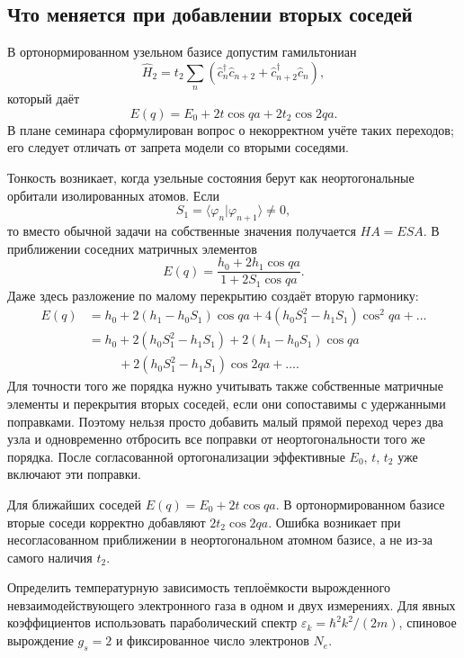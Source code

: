 \documentclass[../final.tex]{subfiles}
\begin{document}
\subsection*{Что меняется при добавлении вторых соседей}

В ортонормированном узельном базисе допустим гамильтониан
\[
    \hat H_2=t_2\sum_n
       (\hat c_n^\dagger\hat c_{n+2}+\hat c_{n+2}^\dagger\hat c_n),
\]
который даёт
\[
    E(q)=E_0+2t\cos qa+2t_2\cos2qa.
\]
В плане семинара сформулирован вопрос о некорректном учёте таких
переходов; его следует отличать от запрета модели со вторыми соседями.

Тонкость возникает, когда узельные состояния берут как
неортогональные орбитали изолированных атомов. Если
\[
    S_1=\langle\varphi_n|\varphi_{n+1}\rangle\ne0,
\]
то вместо обычной задачи на собственные значения получается
$HA=ESA$. В приближении соседних матричных элементов
\[
    E(q)=\frac{h_0+2h_1\cos qa}{1+2S_1\cos qa}.
\]
Даже здесь разложение по малому перекрытию создаёт вторую гармонику:
\begin{align*}
    E(q)&=h_0+2(h_1-h_0S_1)\cos qa
        +4(h_0S_1^2-h_1S_1)\cos^2qa+\ldots\\
       &=h_0+2(h_0S_1^2-h_1S_1)
        +2(h_1-h_0S_1)\cos qa\\
       &\hspace{1cm}+2(h_0S_1^2-h_1S_1)\cos2qa+\ldots.
\end{align*}
Для точности того же порядка нужно учитывать также собственные
матричные элементы и перекрытия вторых соседей, если они
сопоставимы с удержанными поправками.
Поэтому нельзя просто добавить малый прямой переход через два узла
и одновременно отбросить все поправки от неортогональности того же порядка.
После согласованной ортогонализации эффективные $E_0$, $t$, $t_2$
уже включают эти поправки.

\answer
Для ближайших соседей $E(q)=E_0+2t\cos qa$.
В ортонормированном базисе вторые соседи корректно добавляют
$2t_2\cos2qa$. Ошибка возникает при несогласованном приближении
в неортогональном атомном базисе, а не из-за самого наличия $t_2$.
\endgroup

\clearpage
\begingroup
\renewcommand{\thesection}{\arabic{section}}

\condition
Определить температурную зависимость теплоёмкости вырожденного
невзаимодействующего электронного газа в одном и двух измерениях.
Для явных коэффициентов использовать параболический спектр
$\varepsilon_k=\hbar^2k^2/(2m)$, спиновое вырождение $g_s=2$
и фиксированное число электронов $N_e$.
\end{document}
